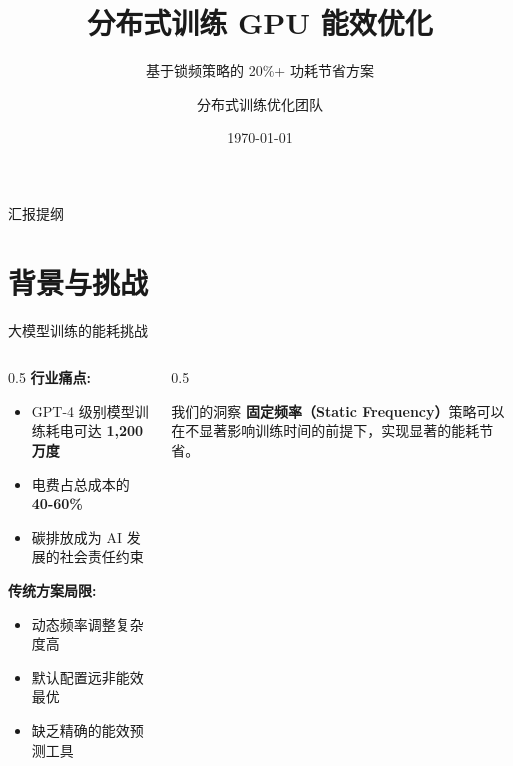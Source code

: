 \documentclass[aspectratio=169,10pt]{beamer}
\title[GPU能效优化]{\textbf{分布式训练 GPU 能效优化}}
\subtitle{基于锁频策略的 20\%+ 功耗节省方案}
\author[团队]{分布式训练优化团队}
\institute[]{Megatron-DeepSpeed 能效实验项目}
\date{\today}
\begin{document}
{
\begin{frame}
\titlepage
\end{frame}
}

\begin{frame}{汇报提纲}
\tableofcontents
\end{frame}

\section{背景与挑战}

\begin{frame}{大模型训练的能耗挑战}
\begin{columns}
\begin{column}{0.5\textwidth}
\textbf{行业痛点:}
\begin{itemize}
    \item GPT-4 级别模型训练耗电可达 \textbf{1,200 万度}
    \item 电费占总成本的 \textbf{40-60\%}
    \item 碳排放成为 AI 发展的社会责任约束
\end{itemize}
\vspace{0.5cm}
\textbf{传统方案局限:}
\begin{itemize}
    \item 动态频率调整复杂度高
    \item 默认配置远非能效最优
    \item 缺乏精确的能效预测工具
\end{itemize}
\end{column}
\begin{column}{0.5\textwidth}
\begin{block}{我们的洞察}
\textbf{固定频率（Static Frequency）}策略可以在不显著影响训练时间的前提下，实现显著的能耗节省。
\end{block}
\vspace{0.3cm}
\end{column}
\end{columns}
\end{frame}
\end{document}
